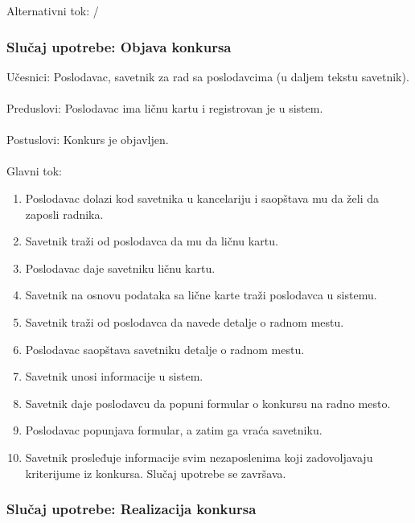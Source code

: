 \noindent Alternativni tok: /

\subsubsection{Slu\v caj upotrebe: Objava konkursa}
\label{su: razgovor sa poslodavcem}

\noindent Učesnici: Poslodavac, savetnik za rad sa poslodavcima (u daljem tekstu savetnik).
\\
\\ Preduslovi: Poslodavac ima ličnu kartu i registrovan je u sistem.
\\
\\ Postuslovi: Konkurs je objavljen.
\\
\\ Glavni tok:
\begin{enumerate}
\item Poslodavac dolazi kod savetnika u kancelariju i saopštava mu da želi da zaposli radnika.
\item Savetnik traži od poslodavca da mu da ličnu kartu.
\item Poslodavac daje savetniku ličnu kartu.
\item Savetnik na osnovu podataka sa lične karte traži poslodavca u sistemu.
\item Savetnik traži od poslodavca da navede detalje o radnom mestu.
\item Poslodavac saopštava savetniku detalje o radnom mestu.
\item Savetnik unosi informacije u sistem.
\item Savetnik daje poslodavcu da popuni formular o konkursu na radno mesto.
\item Poslodavac popunjava formular, a zatim ga vraća savetniku.
\item Savetnik prosleđuje informacije svim nezaposlenima koji zadovoljavaju kriterijume iz konkursa. Slučaj upotrebe se završava.
\end{enumerate}

\subsubsection{Slu\v caj upotrebe: Realizacija konkursa}

